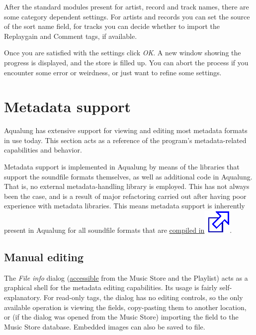 \documentclass[10pt,english]{article}
\begin{document}
After the standard modules present for artist, record and
track names, there are some category dependent settings. For
artists and records you can set the source of the sort name
field, for tracks you can decide whether to import the
Replaygain and Comment tags, if available.




Once you are satisfied with the settings click
\textsl{OK}. A new window showing the progress is
displayed, and the store is filled up. You can abort the
process if you encounter some error or weirdness, or just
want to refine some settings.








\section{Metadata support\label{idp695360}}



\noindent Aqualung has extensive support for viewing and editing
most metadata formats in use today. This section acts as a
reference of the program's metadata-related capabilities and
behavior.




Metadata support is implemented in Aqualung by means of the
libraries that support the soundfile formats themselves, as well
as additional code in Aqualung. That is, no external
metadata-handling library is employed. This has not always been
the case, and is a result of major refactoring carried out after
having poor experience with metadata libraries. This means
metadata support is inherently present in Aqualung for all
soundfile formats that are \href{http://aqualung.factorial.hu/compiling.html}{compiled
in\includegraphics[scale=0.5]{external.eps}}.


\subsection{Manual editing\label{idp698480}}



\noindent The \textsl{File info} dialog (\hyperref[idp575376]{\color{blue}accessible} from the
Music Store and the Playlist) acts as a graphical shell for
the metadata editing capabilities. Its usage is fairly
self-explanatory. For read-only tags, the dialog has no
editing controls, so the only available operation is viewing
the fields, copy-pasting them to another location, or (if the
dialog was opened from the Music Store) importing the field to
the Music Store database. Embedded images can also be saved to
file.
\end{document}
